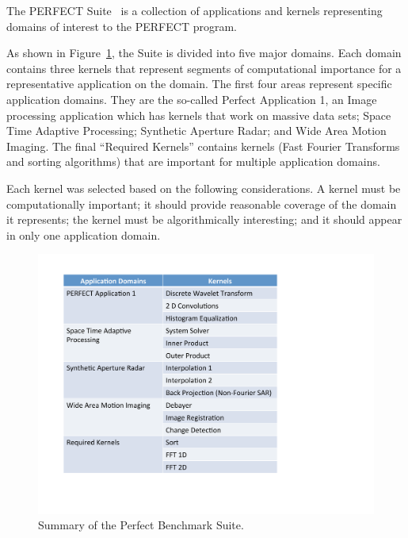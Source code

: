 \documentclass{report}
\begin{document}
The PERFECT Suite~\cite{perfect-suite-man} is a collection of applications and kernels representing domains of interest to the PERFECT program.

As shown in Figure~\ref{fig:suite-taxonomy}, the Suite is divided into five major domains.
Each domain contains three kernels that represent segments of computational importance for a representative application on the domain.
The first four areas represent specific application domains.
They are the so-called Perfect Application 1, an Image processing application which has kernels that work on massive data sets; Space Time Adaptive Processing; Synthetic Aperture Radar; and Wide Area Motion Imaging.
The final ``Required Kernels'' contains kernels (Fast Fourier Transforms and sorting algorithms) that are important for multiple application domains.

Each kernel was selected based on the following considerations.
A kernel must be computationally important; it should provide reasonable coverage of the domain it represents; the kernel must be algorithmically interesting; and it should appear in only one application domain.

\begin{figure}
    \centering
    \includegraphics[width=1.0\textwidth]{figs/suite-taxonomy}
    \caption{Summary of the Perfect Benchmark Suite.}
    \label{fig:suite-taxonomy}
\end{figure}


\end{document}
